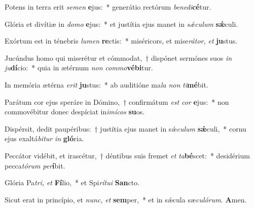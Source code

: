 \item Potens in terra erit \textit{semen} \textbf{e}jus:~* generátio rectórum \textit{benedi}\textbf{cé}tur.
\item Glória et divítiæ in \textit{domo} \textbf{e}jus:~* et justítia ejus manet in \textit{sǽculum} \textbf{sǽ}culi.
\item Exórtum est in ténebris \textit{lumen} \textbf{re}ctis:~* miséricors, et mise\textit{rátor,} \textit{et} \textbf{ju}stus.
\item Jucúndus homo qui miserétur et cómmodat,~† dispónet sermónes suos \textit{in} \textit{ju}\textbf{dí}cio:~* quia in ætérnum \textit{non} \textit{commo}\textbf{vébi}tur.
\item In memória ætérna \textit{erit} \textbf{ju}stus:~* ab auditióne ma\tinyhspace\textit{la} \textit{non} \textit{ti}\textbf{mé}bit.
\item Parátum cor ejus speráre in Dómino,~† confirmátum \textit{est} \textit{cor} \textbf{e}jus:~* non commovébitur donec despíciat in\textit{imícos} \textbf{su}os.
\item Dispérsit, dedit paupéribus:~† justítia ejus manet in sǽ\tinyhspace\textit{culum} \textbf{sǽ}culi,~* cornu ejus exaltá\tinyhspace\textit{bitur} \textit{in} \textbf{gló}ria.
\item Peccátor vidébit, et irascétur,~† déntibus suis fremet \textit{et} \textit{ta}\textbf{bé}scet:~* desidérium pecca\tinyhspace\textit{tórum} \textit{per}\textbf{í}bit.
\item Glória Pa\myhspace\textit{tri,} \textit{et} \textbf{Fí}lio,~* et Spi\textit{rítui} \textbf{San}cto.
\item Sicut erat in princípio, et \textit{nunc,} \textit{et} \textbf{sem}per,~* et in sǽcula sæ\tinyhspace\textit{culórum.} \textbf{A}men.
